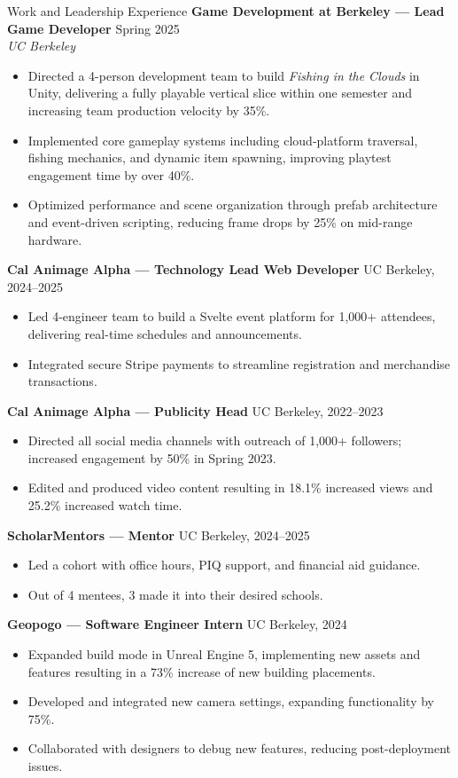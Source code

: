 \documentclass{resume}
\begin{document}
\begin{rSection}{Work and Leadership Experience}
\textbf{Game Development at Berkeley — Lead Game Developer} \hfill Spring 2025 \\
\textit{UC Berkeley}
\begin{itemize}
  \item Directed a 4-person development team to build \textit{Fishing in the Clouds} in Unity, delivering a fully playable vertical slice within one semester and increasing team production velocity by 35\%.
  \item Implemented core gameplay systems including cloud‑platform traversal, fishing mechanics, and dynamic item spawning, improving playtest engagement time by over 40\%.
  \item Optimized performance and scene organization through prefab architecture and event-driven scripting, reducing frame drops by 25\% on mid-range hardware.
\end{itemize}


\textbf{Cal Animage Alpha — Technology Lead Web Developer} \hfill UC Berkeley, 2024–2025
\begin{itemize}
  \item Led 4-engineer team to build a Svelte event platform for 1,000+ attendees, delivering real-time schedules and announcements.
  \item Integrated secure Stripe payments to streamline registration and merchandise transactions.
\end{itemize}

\textbf{Cal Animage Alpha — Publicity Head} \hfill UC Berkeley, 2022–2023
\begin{itemize}
  \item Directed all social media channels with outreach of 1,000+ followers; increased engagement by 50\% in Spring 2023.
  \item Edited and produced video content resulting in 18.1\% increased views and 25.2\% increased watch time.
\end{itemize}

\textbf{ScholarMentors — Mentor} \hfill UC Berkeley, 2024–2025
\begin{itemize}
  \item Led a cohort with office hours, PIQ support, and financial aid guidance.
  \item Out of 4 mentees, 3 made it into their desired schools.
\end{itemize}

\textbf{Geopogo — Software Engineer Intern} \hfill UC Berkeley, 2024
\begin{itemize}
  \item Expanded build mode in Unreal Engine 5, implementing new assets and features resulting in a 73\% increase of new building placements.
  \item Developed and integrated new camera settings, expanding functionality by 75\%.
  \item Collaborated with designers to debug new features, reducing post-deployment issues.
\end{itemize}


\end{rSection}
\end{document}
